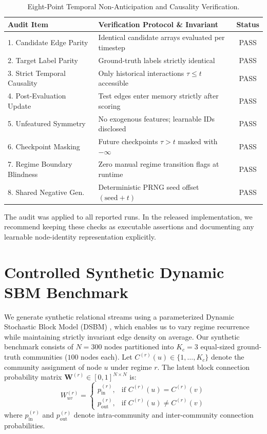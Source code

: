 \documentclass[conference]{IEEEtran}
\begin{document}
\begin{table}[htbp]
\caption{Eight-Point Temporal Non-Anticipation and Causality Verification.}
\label{tab:audit}
\centering
\begin{tabular}{p{3.2cm}p{3.8cm}c}
\toprule
\textbf{Audit Item} & \textbf{Verification Protocol \& Invariant} & \textbf{Status} \\
\midrule
1. Candidate Edge Parity & Identical candidate arrays evaluated per timestep & PASS \\
2. Target Label Parity & Ground-truth labels strictly identical & PASS \\
3. Strict Temporal Causality & Only historical interactions $\tau \le t$ accessible & PASS \\
4. Post-Evaluation Update & Test edges enter memory strictly after scoring & PASS \\
5. Unfeatured Symmetry & No exogenous features; learnable IDs disclosed & PASS \\
6. Checkpoint Masking & Future checkpoints $\tau > t$ masked with $-\infty$ & PASS \\
7. Regime Boundary Blindness & Zero manual regime transition flags at runtime & PASS \\
8. Shared Negative Gen. & Deterministic PRNG seed offset $(\text{seed} + t)$ & PASS \\
\bottomrule
\end{tabular}
\end{table}

The audit was applied to all reported runs. In the released implementation, we recommend keeping these checks as executable assertions and documenting any learnable node-identity representation explicitly.

\section{Controlled Synthetic Dynamic SBM Benchmark}
We generate synthetic relational streams using a parameterized Dynamic Stochastic Block Model (DSBM) \cite{holland1983stochastic}, which enables us to vary regime recurrence while maintaining strictly invariant edge density on average. Our synthetic benchmark consists of $N=300$ nodes partitioned into $K_c=3$ equal-sized ground-truth communities ($100$ nodes each). Let $C^{(r)}(u) \in \{1, \dots, K_c\}$ denote the community assignment of node $u$ under regime $r$. The latent block connection probability matrix $\mathbf{W}^{(r)} \in [0, 1]^{N \times N}$ is:
\begin{equation}
\label{eq:sbm_matrix}
W_{uv}^{(r)} = \begin{cases} p_{\text{in}}^{(r)}, & \text{if } C^{(r)}(u) = C^{(r)}(v) \\ p_{\text{out}}^{(r)}, & \text{if } C^{(r)}(u) \neq C^{(r)}(v) \end{cases}
\end{equation}
where $p_{\text{in}}^{(r)}$ and $p_{\text{out}}^{(r)}$ denote intra-community and inter-community connection probabilities.
\end{document}
